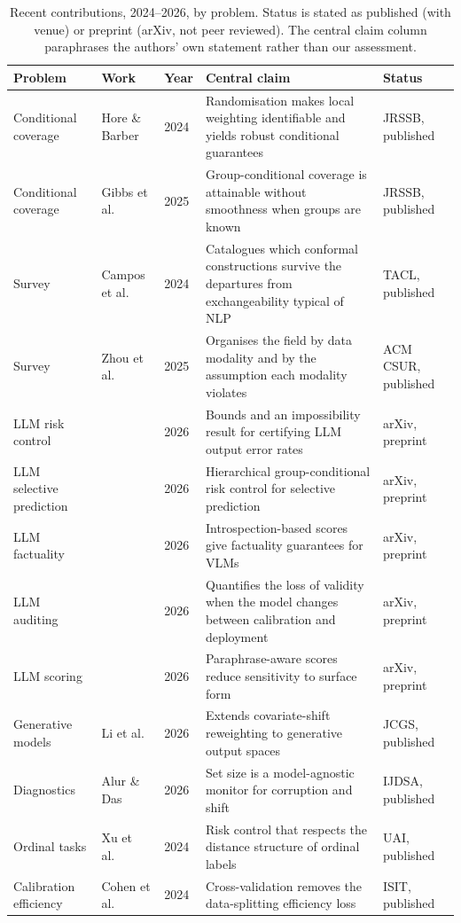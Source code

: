 \documentclass[a4paper,longmktitle]{cas-sc}
\begin{document}
\begin{table}[pos=htbp]
\centering
\footnotesize
\caption{Recent contributions, 2024--2026, by problem. Status is stated as published (with venue) or preprint (arXiv, not peer reviewed). The central claim column paraphrases the authors' own statement rather than our assessment.}
\label{tab:2}
\begin{tabularx}{\textwidth}{@{}Y{0.78}Y{1.14}Y{0.58}Y{1.60}Y{0.90}@{}}
\toprule
\textbf{Problem} & \textbf{Work} & \textbf{Year} & \textbf{Central claim} & \textbf{Status} \\
\midrule
Conditional coverage & Hore \& Barber \cite{Hore2024} & 2024 & Randomisation makes local weighting identifiable and yields robust conditional guarantees & JRSSB, published \\
Conditional coverage & Gibbs et al.\ \cite{Gibbs2025} & 2025 & Group-conditional coverage is attainable without smoothness when groups are known & JRSSB, published \\
Survey & Campos et al.\ \cite{Campos2024} & 2024 & Catalogues which conformal constructions survive the departures from exchangeability typical of NLP & TACL, published \\
Survey & Zhou et al.\ \cite{Zhou2025} & 2025 & Organises the field by data modality and by the assumption each modality violates & ACM CSUR, published \\
LLM risk control & \cite{CRC_LLM} & 2026 & Bounds and an impossibility result for certifying LLM output error rates & arXiv, preprint \\
LLM selective prediction & \cite{HierCRC} & 2026 & Hierarchical group-conditional risk control for selective prediction & arXiv, preprint \\
LLM factuality & \cite{IntroConformal} & 2026 & Introspection-based scores give factuality guarantees for VLMs & arXiv, preprint \\
LLM auditing & \cite{AuditCP} & 2026 & Quantifies the loss of validity when the model changes between calibration and deployment & arXiv, preprint \\
LLM scoring & \cite{ParaCP} & 2026 & Paraphrase-aware scores reduce sensitivity to surface form & arXiv, preprint \\
Generative models & Li et al.\ \cite{Li2026gen} & 2026 & Extends covariate-shift reweighting to generative output spaces & JCGS, published \\
Diagnostics & Alur \& Das \cite{Alur2026} & 2026 & Set size is a model-agnostic monitor for corruption and shift & IJDSA, published \\
Ordinal tasks & Xu et al.\ \cite{OrdinalCRC} & 2024 & Risk control that respects the distance structure of ordinal labels & UAI, published \\
Calibration efficiency & Cohen et al.\ \cite{XVCrc} & 2024 & Cross-validation removes the data-splitting efficiency loss & ISIT, published \\
\bottomrule
\end{tabularx}
\end{table}
\end{document}

